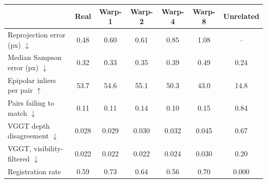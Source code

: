 \begin{tabular}{lcccccc}
\toprule
 & Real & Warp-1 & Warp-2 & Warp-4 & Warp-8 & Unrelated \\
\midrule
Reprojection error (px) $\downarrow$ & 0.48 & 0.60 & 0.61 & 0.85 & 1.08 & -- \\
Median Sampson error (px) $\downarrow$ & 0.32 & 0.33 & 0.35 & 0.39 & 0.49 & 0.24 \\
Epipolar inliers per pair $\uparrow$ & 53.7 & 54.6 & 55.1 & 50.3 & 43.0 & 14.8 \\
Pairs failing to match $\downarrow$ & 0.11 & 0.11 & 0.14 & 0.10 & 0.15 & 0.84 \\
VGGT depth disagreement $\downarrow$ & 0.028 & 0.029 & 0.030 & 0.032 & 0.045 & 0.67 \\
VGGT, visibility-filtered $\downarrow$ & 0.022 & 0.022 & 0.022 & 0.024 & 0.030 & 0.20 \\
Registration rate & 0.59 & 0.73 & 0.64 & 0.56 & 0.70 & 0.000 \\
\bottomrule
\end{tabular}